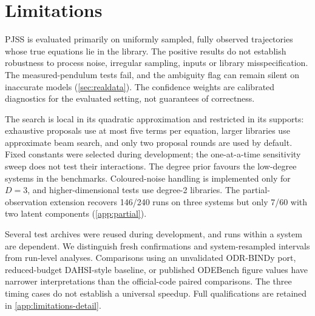 \section{Limitations}
\label{sec:limitations}

PJSS is evaluated primarily on uniformly sampled, fully observed trajectories whose true equations lie in the library. The positive results do not establish robustness to process noise, irregular sampling, inputs or library misspecification. The measured-pendulum tests fail, and the ambiguity flag can remain silent on inaccurate models (\cref{sec:realdata}). The confidence weights are calibrated diagnostics for the evaluated setting, not guarantees of correctness.

The search is local in its quadratic approximation and restricted in its supports: exhaustive proposals use at most five terms per equation, larger libraries use approximate beam search, and only two proposal rounds are used by default. Fixed constants were selected during development; the one-at-a-time sensitivity sweep does not test their interactions. The degree prior favours the low-degree systems in the benchmarks. Coloured-noise handling is implemented only for $D=3$, and higher-dimensional tests use degree-2 libraries. The partial-observation extension recovers 146/240 runs on three systems but only 7/60 with two latent components (\cref{app:partial}).

Several test archives were reused during development, and runs within a system are dependent. We distinguish fresh confirmations and system-resampled intervals from run-level analyses. Comparisons using an unvalidated ODR-BINDy port, reduced-budget DAHSI-style baseline, or published ODEBench figure values have narrower interpretations than the official-code paired comparisons. The three timing cases do not establish a universal speedup. Full qualifications are retained in \cref{app:limitations-detail}.

